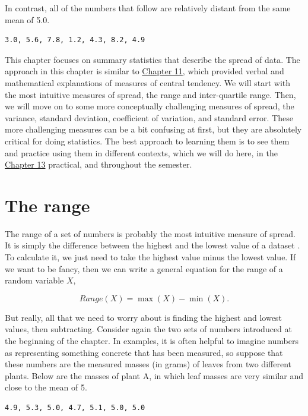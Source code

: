 \documentclass[
]{scrbook}
\begin{document}
In contrast, all of the numbers that follow are relatively distant from the same mean of 5.0.

\begin{verbatim}
3.0, 5.6, 7.8, 1.2, 4.3, 8.2, 4.9
\end{verbatim}

This chapter focuses on summary statistics that describe the spread of data.
The approach in this chapter is similar to \protect\hyperlink{Chapter_11}{Chapter 11}, which provided verbal and mathematical explanations of measures of central tendency.
We will start with the most intuitive measures of spread, the range and inter-quartile range.
Then, we will move on to some more conceptually challenging measures of spread, the variance, standard deviation, coefficient of variation, and standard error.
These more challenging measures can be a bit confusing at first, but they are absolutely critical for doing statistics.
The best approach to learning them is to see them and practice using them in different contexts, which we will do here, in the \protect\hyperlink{Chapter_13}{Chapter 13} practical, and throughout the semester.

\hypertarget{the-range}{%
\section{The range}\label{the-range}}

The range of a set of numbers is probably the most intuitive measure of spread.
It is simply the difference between the highest and the lowest value of a dataset \citep{Sokal1995}.
To calculate it, we just need to take the highest value minus the lowest value.
If we want to be fancy, then we can write a general equation for the range of a random variable \(X\),

\[Range(X) = \max(X) - \min(X).\]

But really, all that we need to worry about is finding the highest and lowest values, then subtracting.
Consider again the two sets of numbers introduced at the beginning of the chapter.
In examples, it is often helpful to imagine numbers as representing something concrete that has been measured, so suppose that these numbers are the measured masses (in grams) of leaves from two different plants.
Below are the masses of plant A, in which leaf masses are very similar and close to the mean of 5.

\begin{verbatim}
4.9, 5.3, 5.0, 4.7, 5.1, 5.0, 5.0
\end{verbatim}
\end{document}
